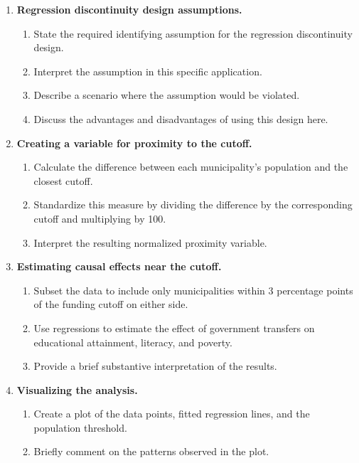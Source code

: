 \documentclass[12pt]{article}
\begin{document}
\begin{enumerate}
    \item \textbf{Regression discontinuity design assumptions.}
    \begin{enumerate}[label=(\alph*)]
        \item State the required identifying assumption for the regression discontinuity design.
        \item Interpret the assumption in this specific application.
        \item Describe a scenario where the assumption would be violated.
        \item Discuss the advantages and disadvantages of using this design here.
    \end{enumerate}

    \item \textbf{Creating a variable for proximity to the cutoff.}
    \begin{enumerate}[label=(\alph*)]
        \item Calculate the difference between each municipality's population and the closest cutoff.
        \item Standardize this measure by dividing the difference by the corresponding cutoff and multiplying by 100.
        \item Interpret the resulting normalized proximity variable.
    \end{enumerate}

    \item \textbf{Estimating causal effects near the cutoff.}
    \begin{enumerate}[label=(\alph*)]
        \item Subset the data to include only municipalities within 3 percentage points of the funding cutoff on either side.
        \item Use regressions to estimate the effect of government transfers on educational attainment, literacy, and poverty.
        \item Provide a brief substantive interpretation of the results.
    \end{enumerate}

    \item \textbf{Visualizing the analysis.}
    \begin{enumerate}[label=(\alph*)]
        \item Create a plot of the data points, fitted regression lines, and the population threshold.
        \item Briefly comment on the patterns observed in the plot.
    \end{enumerate}


\end{enumerate}
\end{document}
